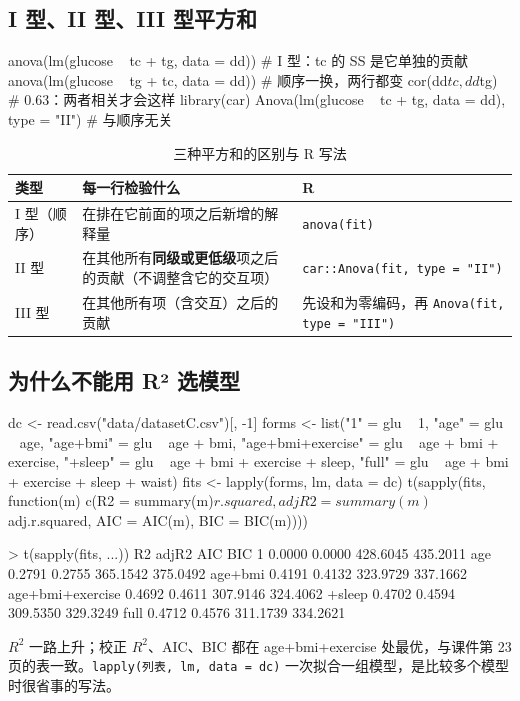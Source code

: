 \subsection{I 型、II 型、III 型平方和}
\begin{RCode}[R · 顺序与平方和类型]
anova(lm(glucose ~ tc + tg, data = dd))     # I 型：tc 的 SS 是它单独的贡献
anova(lm(glucose ~ tg + tc, data = dd))     # 顺序一换，两行都变
cor(dd$tc, dd$tg)                           # 0.63：两者相关才会这样
library(car)
Anova(lm(glucose ~ tc + tg, data = dd), type = "II")   # 与顺序无关
\end{RCode}
\begin{table}[htbp]
\centering\small
\caption{三种平方和的区别与 R 写法}
\begin{tabular}{@{}p{2.2cm}p{7.2cm}p{4.6cm}@{}}
\toprule
类型 & 每一行检验什么 & R\\
\midrule
I 型（顺序） & 在排在它前面的项之后新增的解释量 & \Verb|anova(fit)|\\
II 型 & 在其他所有\textbf{同级或更低级}项之后的贡献（不调整含它的交互项） & \Verb|car::Anova(fit, type = "II")|\\
III 型 & 在其他所有项（含交互）之后的贡献 & 先设和为零编码，再 \Verb|Anova(fit, type = "III")|\\
\bottomrule
\end{tabular}
\end{table}

\subsection{为什么不能用 R² 选模型}
\begin{RCode}[R · 一组嵌套模型的五个指标]
dc <- read.csv("data/datasetC.csv")[, -1]
forms <- list("1" = glu ~ 1, "age" = glu ~ age, "age+bmi" = glu ~ age + bmi,
              "age+bmi+exercise" = glu ~ age + bmi + exercise,
              "+sleep" = glu ~ age + bmi + exercise + sleep,
              "full" = glu ~ age + bmi + exercise + sleep + waist)
fits <- lapply(forms, lm, data = dc)
t(sapply(fits, function(m) c(R2 = summary(m)$r.squared,
  adjR2 = summary(m)$adj.r.squared, AIC = AIC(m), BIC = BIC(m))))
\end{RCode}
\begin{ROut}
> t(sapply(fits, ...))
                     R2  adjR2      AIC      BIC
1                0.0000 0.0000 428.6045 435.2011
age              0.2791 0.2755 365.1542 375.0492
age+bmi          0.4191 0.4132 323.9729 337.1662
age+bmi+exercise 0.4692 0.4611 307.9146 324.4062
+sleep           0.4702 0.4594 309.5350 329.3249
full             0.4712 0.4576 311.1739 334.2621
\end{ROut}
$R^2$ 一路上升；校正 $R^2$、AIC、BIC 都在 age+bmi+exercise 处最优，与课件第 23 页的表一致。\Verb|lapply(列表, lm, data = dc)| 一次拟合一组模型，是比较多个模型时很省事的写法。

